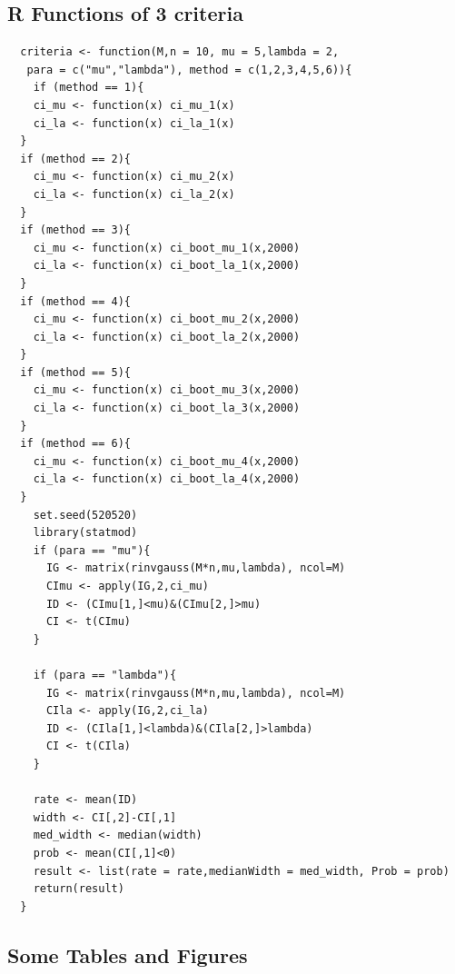 \documentclass[12pt]{article}
\begin{document}
\noindent\makebox[\linewidth]{\rule{\textwidth}{1pt}}

\noindent\makebox[\linewidth]{\rule{\textwidth}{1pt}}

\subsection{R Functions of 3 criteria}
\noindent\makebox[\linewidth]{\rule{\textwidth}{1pt}}
\begin{verbatim}
  criteria <- function(M,n = 10, mu = 5,lambda = 2,
   para = c("mu","lambda"), method = c(1,2,3,4,5,6)){
    if (method == 1){
    ci_mu <- function(x) ci_mu_1(x)
    ci_la <- function(x) ci_la_1(x)
  }
  if (method == 2){
    ci_mu <- function(x) ci_mu_2(x)
    ci_la <- function(x) ci_la_2(x)
  }
  if (method == 3){
    ci_mu <- function(x) ci_boot_mu_1(x,2000)
    ci_la <- function(x) ci_boot_la_1(x,2000)
  }
  if (method == 4){
    ci_mu <- function(x) ci_boot_mu_2(x,2000)
    ci_la <- function(x) ci_boot_la_2(x,2000)
  }
  if (method == 5){
    ci_mu <- function(x) ci_boot_mu_3(x,2000)
    ci_la <- function(x) ci_boot_la_3(x,2000)
  }
  if (method == 6){
    ci_mu <- function(x) ci_boot_mu_4(x,2000)
    ci_la <- function(x) ci_boot_la_4(x,2000)
  }
    set.seed(520520)
    library(statmod)
    if (para == "mu"){
      IG <- matrix(rinvgauss(M*n,mu,lambda), ncol=M)
      CImu <- apply(IG,2,ci_mu)
      ID <- (CImu[1,]<mu)&(CImu[2,]>mu)
      CI <- t(CImu)
    }
    
    if (para == "lambda"){
      IG <- matrix(rinvgauss(M*n,mu,lambda), ncol=M)
      CIla <- apply(IG,2,ci_la)
      ID <- (CIla[1,]<lambda)&(CIla[2,]>lambda)
      CI <- t(CIla)
    }
    
    rate <- mean(ID)
    width <- CI[,2]-CI[,1]
    med_width <- median(width)
    prob <- mean(CI[,1]<0)
    result <- list(rate = rate,medianWidth = med_width, Prob = prob)
    return(result)
  }
\end{verbatim}
\noindent\makebox[\linewidth]{\rule{\textwidth}{1pt}}

\subsection{Some Tables and Figures}
\end{document}
